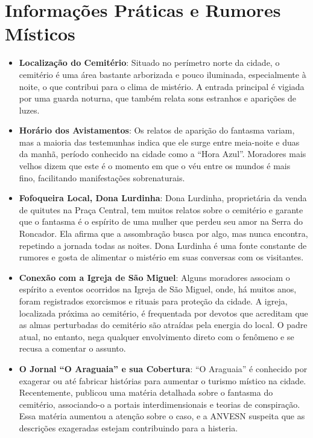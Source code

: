\section{Informações Práticas e Rumores Místicos}
\begin{itemize}
    \item \textbf{Localização do Cemitério}: Situado no perímetro norte da cidade, o cemitério é uma área bastante arborizada e pouco iluminada, especialmente à noite, o que contribui para o clima de mistério. A entrada principal é vigiada por uma guarda noturna, que também relata sons estranhos e aparições de luzes.

    \item \textbf{Horário dos Avistamentos}: Os relatos de aparição do fantasma variam, mas a maioria das testemunhas indica que ele surge entre meia-noite e duas da manhã, período conhecido na cidade como a ``Hora Azul''. Moradores mais velhos dizem que este é o momento em que o véu entre os mundos é mais fino, facilitando manifestações sobrenaturais.

    \item \textbf{Fofoqueira Local, Dona Lurdinha}: Dona Lurdinha, proprietária da venda de quitutes na Praça Central, tem muitos relatos sobre o cemitério e garante que o fantasma é o espírito de uma mulher que perdeu seu amor na Serra do Roncador. Ela afirma que a assombração busca por algo, mas nunca encontra, repetindo a jornada todas as noites. Dona Lurdinha é uma fonte constante de rumores e gosta de alimentar o mistério em suas conversas com os visitantes.

    \item \textbf{Conexão com a Igreja de São Miguel}: Alguns moradores associam o espírito a eventos ocorridos na Igreja de São Miguel, onde, há muitos anos, foram registrados exorcismos e rituais para proteção da cidade. A igreja, localizada próxima ao cemitério, é frequentada por devotos que acreditam que as almas perturbadas do cemitério são atraídas pela energia do local. O padre atual, no entanto, nega qualquer envolvimento direto com o fenômeno e se recusa a comentar o assunto.

    \item \textbf{O Jornal ``O Araguaia'' e sua Cobertura}: ``O Araguaia'' é conhecido por exagerar ou até fabricar histórias para aumentar o turismo místico na cidade. Recentemente, publicou uma matéria detalhada sobre o fantasma do cemitério, associando-o a portais interdimensionais e teorias de conspiração. Essa matéria aumentou a atenção sobre o caso, e a ANVESN suspeita que as descrições exageradas estejam contribuindo para a histeria.


\end{itemize}
